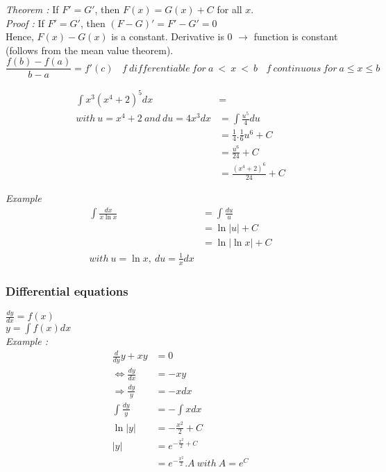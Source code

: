 \documentclass{article}
\begin{document}
    \textit{Theorem : } If $F' = G'$, then $F(x)=G(x)+C$ for all $x$.\\
    \textit{Proof :} If $F' = G'$, then $(F - G)' = F' - G' = 0$\\
    Hence, $F(x)-G(x)$ is a constant. Derivative is 0 $\rightarrow$ function is constant (follows from the mean value theorem).\\

    \[
    \label{Mean value theorem}
    \frac{f(b) - f(a)}{b-a} = f'(c)~ ~ ~ ~
    f ~differentiable ~for~ a~ < ~x ~< ~b ~ ~ ~ ~
    f ~continuous ~for~ a \leq x \leq b
    \]

    \begin{align*}
        \int x^3 (x^4 + 2)^5 dx &= \\
        with~ u = x^4 +2 ~and ~du = 4x^3 dx
        &= \int \frac{u^5}{4}du\\
        &= \frac{1}{4}.\frac{1}{6}u^6+C\\
        &= \frac{u^6}{24}+C\\
        &= \frac{(x^4 +2)^6}{24}+C
    \end{align*}

    \textit{Example}
    \begin{align*}
        \int \frac{dx}{x\ln x} &= \int \frac{du}{u}\\
        &= \ln |u| + C\\
        &= \ln |\ln x| +C\\
        with~ u=\ln x, ~ du=\frac{1}{x}dx
    \end{align*}



    \subsubsection{Differential equations}

    $\frac{dy}{dx} = f(x)$\\
    $y = \int f(x)dx$\\

    \textit{Example :}\\
    \begin{align*}
        \frac{d}{dy}y + xy &= 0 \\
        \Leftrightarrow \frac{dy}{dx}&=-xy\\
        \Rightarrow \frac{dy}{y} &= -xdx\\
        \int \frac{dy}{y} &= -\int xdx \\
        \ln |y| &= - \frac{x^2}{2}+C\\
        |y| &= e^{-\frac{x^2}{2}+C} \\
        &= e^{-\frac{x^2}{2}}.A ~ with ~ A=e^C
    \end{align*}
\end{document}

